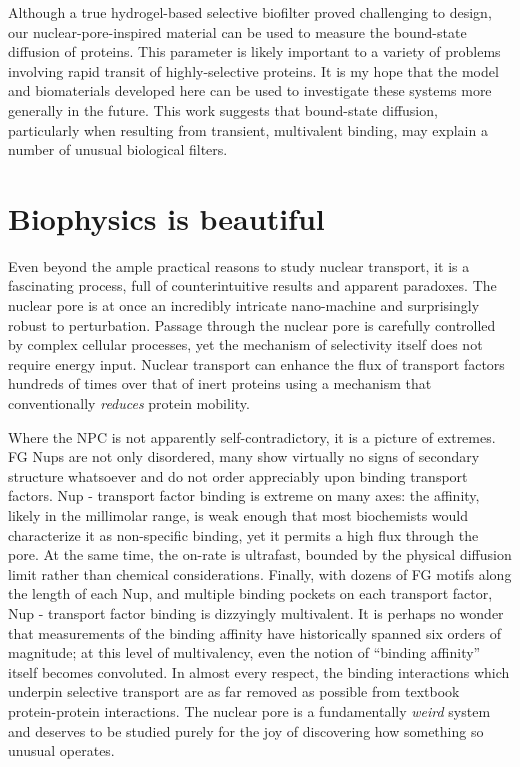 Although a true hydrogel-based selective biofilter proved challenging to design, our nuclear-pore-inspired material can be used to measure the bound-state diffusion of proteins.  This parameter is likely important to a variety of problems involving rapid transit of highly-selective proteins.  It is my hope that the model and biomaterials developed here can be used to investigate these systems more generally in the future.  This work suggests that bound-state diffusion, particularly when resulting from transient, multivalent binding, may explain a number of unusual biological filters.

\section{Biophysics is beautiful}

Even beyond the ample practical reasons to study nuclear transport, it is a fascinating process, full of counterintuitive results and apparent paradoxes.  The nuclear pore is at once an incredibly intricate nano-machine and surprisingly robust to perturbation.  Passage through the nuclear pore is carefully controlled by complex cellular processes, yet the mechanism of selectivity itself does not require energy input.  Nuclear transport can enhance the flux of transport factors hundreds of times over that of inert proteins using a mechanism that conventionally \textit{reduces} protein mobility.

Where the NPC is not apparently self-contradictory, it is a picture of extremes.  FG Nups are not only disordered, many show virtually no signs of secondary structure whatsoever and do not order appreciably upon binding transport factors.  Nup - transport factor binding is extreme on many axes: the affinity, likely in the millimolar range, is weak enough that most biochemists would characterize it as non-specific binding, yet it permits a high flux through the pore.  At the same time, the on-rate is ultrafast, bounded by the physical diffusion limit rather than chemical considerations.  Finally, with dozens of FG motifs along the length of each Nup, and multiple binding pockets on each transport factor, Nup - transport factor binding is dizzyingly multivalent.  It is perhaps no wonder that measurements of the binding affinity have historically spanned six orders of magnitude; at this level of multivalency, even the notion of ``binding affinity'' itself becomes convoluted.  In almost every respect, the binding interactions which underpin selective transport are as far removed as possible from textbook protein-protein interactions.  The nuclear pore is a fundamentally \textit{weird} system and deserves to be studied purely for the joy of discovering how something so unusual operates.

